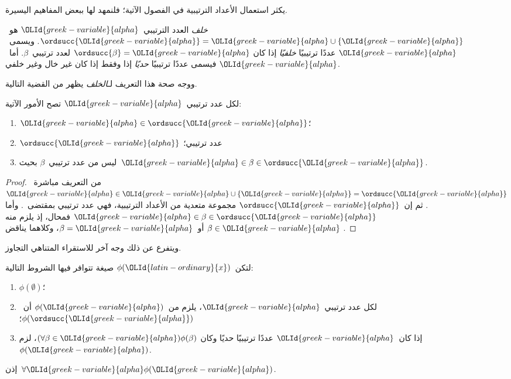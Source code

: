 \documentclass[../../../include/open-logic-section]{subfiles}
\begin{document}

يكثر استعمال الأعداد الترتيبية في الفصول الآتية؛ فلنمهد لها ببعض
المفاهيم اليسيرة.

\begin{defn}
\emph{خلف} العدد الترتيبي~$\OLId{greek-variable}{alpha}$ هو~$\ordsucc{\OLId{greek-variable}{alpha}} =\OLId{greek-variable}{alpha} \cup \{\OLId{greek-variable}{alpha}\}$.
ويسمى~$\OLId{greek-variable}{alpha}$ عددًا ترتيبيًا \emph{خلفيًا} إذا كان
$\ordsucc{\beta} = \OLId{greek-variable}{alpha}$ لعدد ترتيبي~$\beta$. أما~$\OLId{greek-variable}{alpha}$ فيسمى
عددًا ترتيبيًا \emph{حديًا} إذا وفقط إذا كان غير خال وغير خلفي.
\end{defn}
\noindent
ووجه صحة هذا التعريف لـ\emph{الخلف} يظهر من القضية التالية.

\begin{prop}
لكل عدد ترتيبي~$\OLId{greek-variable}{alpha}$ تصح الأمور الآتية:
\begin{enumerate}
\item $\OLId{greek-variable}{alpha} \in \ordsucc{\OLId{greek-variable}{alpha}}$؛
\item $\ordsucc{\OLId{greek-variable}{alpha}}$ عدد ترتيبي؛
\item ليس من عدد ترتيبي~$\beta$ بحيث~$\OLId{greek-variable}{alpha} \in \beta \in \ordsucc{\OLId{greek-variable}{alpha}}$.
\end{enumerate}
\end{prop}

\begin{proof}
من التعريف مباشرة~$\OLId{greek-variable}{alpha} \in \OLId{greek-variable}{alpha} \cup \{\OLId{greek-variable}{alpha}\} = \ordsucc{\OLId{greek-variable}{alpha}}$.
ثم إن~$\ordsucc{\OLId{greek-variable}{alpha}}$ مجموعة متعدية من الأعداد الترتيبية، فهي
عدد ترتيبي بمقتضى~. وأما
$\OLId{greek-variable}{alpha} \in \beta \in \ordsucc{\OLId{greek-variable}{alpha}}$ فمحال، إذ يلزم منه
$\beta \in \OLId{greek-variable}{alpha}$ أو~$\beta = \OLId{greek-variable}{alpha}$، وكلاهما يناقض
.
\end{proof}
\noindent
ويتفرع عن ذلك وجه آخر للاستقراء المتناهي التجاوز.

\begin{thm}
لتكن~$\phi(\OLId{latin-ordinary}{x})$ صيغة تتوافر فيها الشروط التالية:
\begin{enumerate}
\item $\phi(\emptyset)$؛
\item لكل عدد ترتيبي~$\OLId{greek-variable}{alpha}$، يلزم من~$\phi(\OLId{greek-variable}{alpha})$ أن~$\phi(\ordsucc{\OLId{greek-variable}{alpha}})$؛
\item إذا كان~$\OLId{greek-variable}{alpha}$ عددًا ترتيبيًا حديًا وكان
$(\forall \beta \in \OLId{greek-variable}{alpha})\phi(\beta)$، لزم~$\phi(\OLId{greek-variable}{alpha})$.
\end{enumerate}
إذن~$\forall \OLId{greek-variable}{alpha} \phi(\OLId{greek-variable}{alpha})$.
\end{thm}
\end{document}
